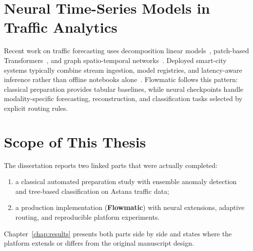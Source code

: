 %
%

\section{Neural Time-Series Models in Traffic Analytics}

Recent work on traffic forecasting uses decomposition linear models~\cite{zeng2023transformers}, patch-based Transformers~\cite{nie2023patchtst}, and graph spatio-temporal networks~\cite{yu2018stgcn}. Deployed smart-city systems typically combine stream ingestion, model registries, and latency-aware inference rather than offline notebooks alone~\cite{its_bigdata2018,event_driven2025}. Flowmatic follows this pattern: classical preparation provides tabular baselines, while neural checkpoints handle modality-specific forecasting, reconstruction, and classification tasks selected by explicit routing rules.

\section{Scope of This Thesis}

The dissertation reports two linked parts that were actually completed:
\begin{enumerate}
  \item a classical automated preparation study with ensemble anomaly detection and tree-based classification on Astana traffic data;
  \item a production implementation (\textbf{Flowmatic}) with neural extensions, adaptive routing, and reproducible platform experiments.
\end{enumerate}
Chapter~\ref{chap:results} presents both parts side by side and states where the platform extends or differs from the original manuscript design.
